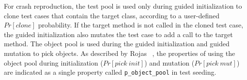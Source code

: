 For crash reproduction, the test pool is used only during guided initialization to clone test cases that contain the target class, according to a user-defined $Pr[clone]$ probability. If the target method is not called in the cloned test case, the guided initialization also mutates the test case to add a call to the target method.
%
The object pool is used during the guided initialization and guided mutation to pick objects. 
As described by Rojas \etal~\cite{Rojas2016}, the properties of using the object pool during initialization ($Pr[pick\ init]$) and mutation ($Pr[pick\ mut]$) are indicated as a single property called \texttt{p\_object\_pool} in test seeding.



%

